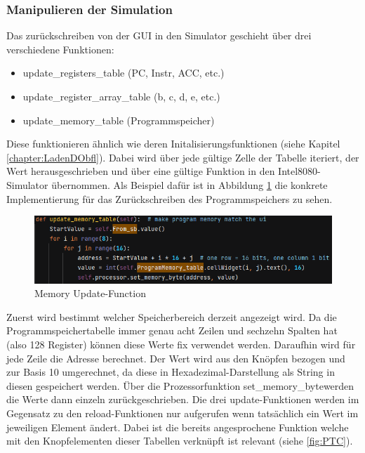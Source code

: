\documentclass[12pt]{article}
\newcommand{\imgSpaceBefore}{\vspace{10pt}}
\begin{document}
\subsubsection{Manipulieren der Simulation}
Das zurückschreiben von der GUI in den Simulator geschieht über drei verschiedene Funktionen:\imgSpaceBefore

\begin{itemize}
	\item update\_registers\_table (PC, Instr, ACC, etc.)
	\item update\_register\_array\_table (b, c, d, e, etc.)
	\item update\_memory\_table (Programmspeicher)
\end{itemize}

\noindent
Diese funktionieren ähnlich wie deren Initalisierungsfunktionen (siehe Kapitel \ref{chapter:LadenDObfl}). Dabei wird über jede gültige Zelle der Tabelle iteriert, der Wert herausgeschrieben und über eine gültige Funktion in den Intel8080-Simulator übernommen. Als Beispiel dafür ist in Abbildung \ref{fig:MemUpdateFunc} die konkrete Implementierung für das Zurückschreiben des Programmspeichers zu sehen.\imgSpaceBefore

\begin{figure}[H]
\centering
\includegraphics[width=15cm]{bilder/UpdateProgMem}
\caption{Memory Update-Function}
\label{fig:MemUpdateFunc}
\end{figure}

\noindent
Zuerst wird bestimmt welcher Speicherbereich derzeit angezeigt wird. Da die Programmspeichertabelle immer genau acht Zeilen und sechzehn Spalten hat (also 128 Register) können diese Werte fix verwendet werden. Daraufhin wird für jede Zeile die Adresse berechnet. Der Wert wird aus den Knöpfen bezogen und zur Basis 10 umgerechnet, da diese in Hexadezimal-Darstellung als String in diesen gespeichert werden. Über die Prozessorfunktion \glqq set\_memory\_byte\grqq werden die Werte dann einzeln zurückgeschrieben. Die drei \glqq update\grqq-Funktionen werden im Gegensatz zu den \glqq reload\grqq-Funktionen nur aufgerufen wenn tatsächlich ein Wert im jeweiligen Element ändert. Dabei ist die bereits angesprochene Funktion welche mit den Knopfelementen dieser Tabellen verknüpft ist relevant (siehe \ref{fig:PTC}).\imgSpaceBefore
\end{document}
